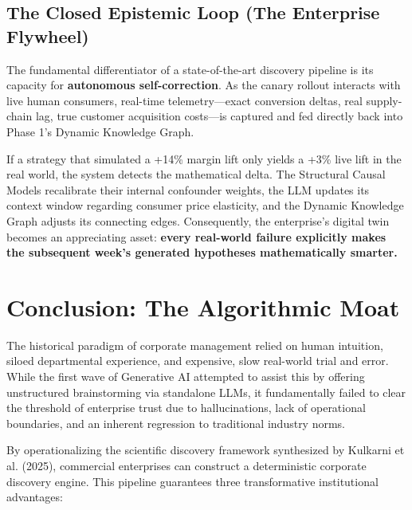 \documentclass[11pt, a4paper]{article}
\begin{document}
\subsection{The Closed Epistemic Loop (The Enterprise Flywheel)}
The fundamental differentiator of a state-of-the-art discovery pipeline is its capacity for \textbf{autonomous self-correction}. As the canary rollout interacts with live human consumers, real-time telemetry---exact conversion deltas, real supply-chain lag, true customer acquisition costs---is captured and fed directly back into Phase 1's Dynamic Knowledge Graph. 

If a strategy that simulated a +14\% margin lift only yields a +3\% live lift in the real world, the system detects the mathematical delta. The Structural Causal Models recalibrate their internal confounder weights, the LLM updates its context window regarding consumer price elasticity, and the Dynamic Knowledge Graph adjusts its connecting edges. Consequently, the enterprise’s digital twin becomes an appreciating asset: \textbf{every real-world failure explicitly makes the subsequent week's generated hypotheses mathematically smarter.}

\section{Conclusion: The Algorithmic Moat}

The historical paradigm of corporate management relied on human intuition, siloed departmental experience, and expensive, slow real-world trial and error. While the first wave of Generative AI attempted to assist this by offering unstructured brainstorming via standalone LLMs, it fundamentally failed to clear the threshold of enterprise trust due to hallucinations, lack of operational boundaries, and an inherent regression to traditional industry norms.

By operationalizing the scientific discovery framework synthesized by Kulkarni et al. (2025), commercial enterprises can construct a deterministic corporate discovery engine. This pipeline guarantees three transformative institutional advantages:
\end{document}
